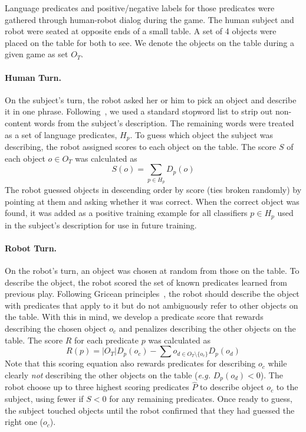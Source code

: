 Language predicates and positive/negative labels for those predicates were
gathered through human-robot dialog during the \ispy game.  The human subject
and robot were seated at opposite ends of a small table.  A set of 4 objects
were placed on the table for both to see.  We denote the objects on the table
during a given game as set $O_T$.

\paragraph{Human Turn.} On the subject's turn, the robot asked her or him to
pick an object and describe it in one phrase.  Following~\cite{parde:ijcai15},
we used a standard stopword list to strip out non-content words from the subject's
description.  The remaining words were treated as a set of language predicates,
$H_p$.  To guess which object the subject was describing, the robot assigned
scores to each object on the table.  The score $S$ of each object $o\in O_T$
was calculated as
\begin{equation}
	S(o) = \sum_{p\in H_p}{D_p(o)}
\end{equation}
The robot guessed objects in descending order by score (ties broken randomly)
by pointing at them and asking whether it was correct.  When the correct object
was found, it was added as a positive training example for all classifiers 
$p\in H_p$ used in the subject's description for use in future training.

\paragraph{Robot Turn.} On the robot's turn, an object was chosen at random
from those on the table.  To describe the object, the robot scored the set of
known predicates learned from previous play.  Following Gricean
principles~\cite{grice:bkchapter75}, the robot should describe the object with
predicates that apply to it but do not ambiguously refer to other objects on the
table.  With this in mind, we develop a predicate score that rewards describing
the chosen object $o_c$ and penalizes describing the other objects on the table.
The score $R$ for each predicate $p$ was calculated as
\begin{equation}
	R(p) = |O_T|D_p(o_c) - \sum{o_{d\in{O_T}\setminus\{o_c\}}}{D_p(o_d)}
\end{equation}
Note that this scoring equation also rewards predicates for describing $o_c$
while clearly {\it not} describing the other objects on the table
(\textit{e.g.}  $D_p(o_d)<0$).  The robot choose up to three highest scoring
predicates $\hat{P}$ to describe object $o_c$ to the subject, using fewer if
$S<0$ for any remaining predicates.  Once ready to guess, the subject touched
objects until the robot confirmed that they had guessed the right one
($o_c$).

